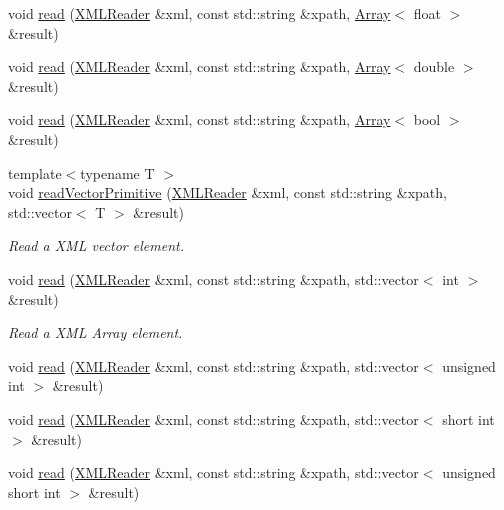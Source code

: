 \begin{DoxyCompactItemize}
\item 
void \mbox{\hyperlink{group__io_gab83c1ad39e65d00b48e6e4b0611c270f}{read}} (\mbox{\hyperlink{classADATXML_1_1XMLReader}{X\+M\+L\+Reader}} \&xml, const std\+::string \&xpath, \mbox{\hyperlink{classXMLArray_1_1Array}{Array}}$<$ float $>$ \&result)
\item 
void \mbox{\hyperlink{group__io_gade490f5b9db35aa7bc58c6bb07848048}{read}} (\mbox{\hyperlink{classADATXML_1_1XMLReader}{X\+M\+L\+Reader}} \&xml, const std\+::string \&xpath, \mbox{\hyperlink{classXMLArray_1_1Array}{Array}}$<$ double $>$ \&result)
\item 
void \mbox{\hyperlink{group__io_gaea910d2bb1864c350f979d14f6c1527f}{read}} (\mbox{\hyperlink{classADATXML_1_1XMLReader}{X\+M\+L\+Reader}} \&xml, const std\+::string \&xpath, \mbox{\hyperlink{classXMLArray_1_1Array}{Array}}$<$ bool $>$ \&result)
\item 
{\footnotesize template$<$typename T $>$ }\\void \mbox{\hyperlink{namespaceADATXML_a485bbc9069166009de61296df9dfe74b}{read\+Vector\+Primitive}} (\mbox{\hyperlink{classADATXML_1_1XMLReader}{X\+M\+L\+Reader}} \&xml, const std\+::string \&xpath, std\+::vector$<$ T $>$ \&result)
\begin{DoxyCompactList}\small\item\em Read a X\+ML vector element. \end{DoxyCompactList}\item 
void \mbox{\hyperlink{group__io_gaba3ec8cd866164ea8bdc810edeaf8210}{read}} (\mbox{\hyperlink{classADATXML_1_1XMLReader}{X\+M\+L\+Reader}} \&xml, const std\+::string \&xpath, std\+::vector$<$ int $>$ \&result)
\begin{DoxyCompactList}\small\item\em Read a X\+ML Array element. \end{DoxyCompactList}\item 
void \mbox{\hyperlink{group__io_ga745a0160808dcca1ec6805d77979bfcc}{read}} (\mbox{\hyperlink{classADATXML_1_1XMLReader}{X\+M\+L\+Reader}} \&xml, const std\+::string \&xpath, std\+::vector$<$ unsigned int $>$ \&result)
\item 
void \mbox{\hyperlink{group__io_ga5ca3f42dfcdc536156476e7f6d6db61c}{read}} (\mbox{\hyperlink{classADATXML_1_1XMLReader}{X\+M\+L\+Reader}} \&xml, const std\+::string \&xpath, std\+::vector$<$ short int $>$ \&result)
\item 
void \mbox{\hyperlink{group__io_gacd64b080900323aa538c91b95c83248d}{read}} (\mbox{\hyperlink{classADATXML_1_1XMLReader}{X\+M\+L\+Reader}} \&xml, const std\+::string \&xpath, std\+::vector$<$ unsigned short int $>$ \&result)

\end{DoxyCompactItemize}
